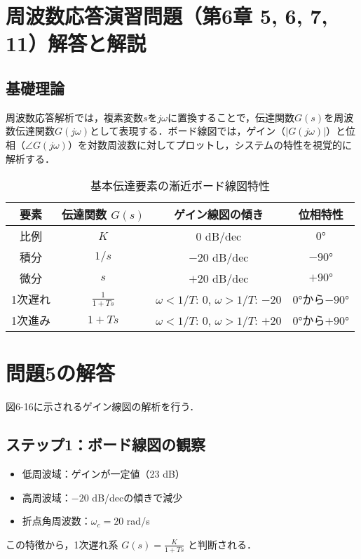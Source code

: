 \documentclass[11pt,a4paper]{ltjsarticle} %
\begin{document}
\section{周波数応答演習問題（第6章 5, 6, 7, 11）解答と解説}

\subsection{基礎理論}
周波数応答解析では，複素変数$s$を$j\omega$に置換することで，伝達関数$G(s)$を周波数伝達関数$G(j\omega)$として表現する．ボード線図では，ゲイン（$|G(j\omega)|$）と位相（$\angle G(j\omega)$）を対数周波数に対してプロットし，システムの特性を視覚的に解析する．

\begin{table}[htbp]
  \caption{基本伝達要素の漸近ボード線図特性}
  \label{tbl:bode_elements}
  \centering
  \begin{tabular}{cccc}
    \toprule
    要素 & 伝達関数 $G(s)$ & ゲイン線図の傾き & 位相特性 \\
    \midrule
    比例 & $K$ & 0 dB/dec & $0°$ \\
    積分 & $1/s$ & $-20$ dB/dec & $-90°$ \\
    微分 & $s$ & $+20$ dB/dec & $+90°$ \\
    1次遅れ & $\frac{1}{1+Ts}$ & $\omega<1/T$: 0, $\omega>1/T$: $-20$ & $0°$から$-90°$ \\
    1次進み & $1+Ts$ & $\omega<1/T$: 0, $\omega>1/T$: $+20$ & $0°$から$+90°$ \\
    \bottomrule
  \end{tabular}
\end{table}

\section{問題5の解答}
図6-16に示されるゲイン線図の解析を行う．

\subsection{ステップ1：ボード線図の観察}
\begin{itemize}
\item 低周波域：ゲインが一定値（23 dB）
\item 高周波域：$-20$ dB/decの傾きで減少
\item 折点角周波数：$\omega_c = 20$ rad/s
\end{itemize}

この特徴から，1次遅れ系 $G(s) = \frac{K}{1+Ts}$ と判断される．
\end{document}
